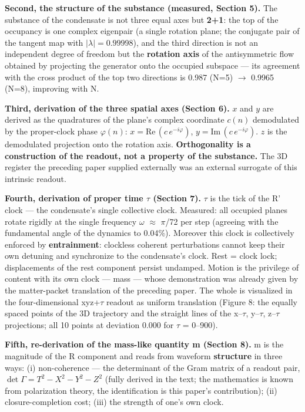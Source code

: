 \documentclass[
  a4paper,
]{article}
\begin{document}
\textbf{Second, the structure of the substance (measured, Section 5).}
The substance of the condensate is not three equal axes but
\textbf{2+1}: the top of the occupancy is one complex eigenpair (a
single rotation plane; the conjugate pair of the tangent map with
\(|\lambda|=0.99998\)), and the third direction is not an independent
degree of freedom but the \textbf{rotation axis} of the antisymmetric
flow obtained by projecting the generator onto the occupied subspace ---
its agreement with the cross product of the top two directions is 0.987
(N=5) \(\to\) 0.9965 (N=8), improving with N.

\textbf{Third, derivation of the three spatial axes (Section 6).} \(x\)
and \(y\) are derived as the quadratures of the plane's complex
coordinate \(c(n)\) demodulated by the proper-clock phase
\(\varphi(n)\): \(x=\mathrm{Re}\,(c\,e^{-i\varphi})\),
\(y=\mathrm{Im}\,(c\,e^{-i\varphi})\). \(z\) is the demodulated
projection onto the rotation axis. \textbf{Orthogonality is a
construction of the readout, not a property of the substance.} The 3D
register the preceding paper supplied externally was an external
surrogate of this intrinsic readout.

\textbf{Fourth, derivation of proper time \(\tau\) (Section 7).}
\(\tau\) is the tick of the R' clock --- the condensate's single
collective clock. Measured: all occupied planes rotate rigidly at the
single frequency \(\omega\) \(\approx\) \(\pi\)/72 per step (agreeing
with the fundamental angle of the dynamics to 0.04\%). Moreover this
clock is collectively enforced by \textbf{entrainment}: clockless
coherent perturbations cannot keep their own detuning and synchronize to
the condensate's clock. Rest = clock lock; displacements of the rest
component persist undamped. Motion is the privilege of content with its
own clock --- mass --- whose demonstration was already given by the
matter-packet translation of the preceding paper. The whole is
visualized in the four-dimensional xyz+\(\tau\) readout as uniform
translation (Figure 8: the equally spaced points of the 3D trajectory
and the straight lines of the x--\(\tau\), y--\(\tau\), z--\(\tau\)
projections; all 10 points at deviation 0.000 for \(\tau\) = 0--900).

\textbf{Fifth, re-derivation of the mass-like quantity m (Section 8).} m
is the magnitude of the R component and reads from waveform
\textbf{structure} in three ways: (i) non-coherence --- the determinant
of the Gram matrix of a readout pair, \(\det\Gamma = T^2-X^2-Y^2-Z^2\)
(fully derived in the text; the mathematics is known from polarization
theory, the identification is this paper's contribution); (ii)
closure-completion cost; (iii) the strength of one's own clock.
\end{document}
